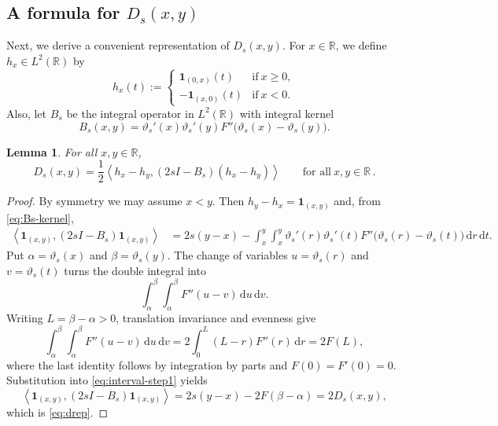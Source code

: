 \documentclass[11pt]{article}
\newtheorem{lemma}[theorem]{Lemma}
\theoremstyle{definition}
\theoremstyle{remark}
\newcommand{\R}{\mathbb{R}}
\newcommand{\ip}[2]{\left\langle #1,#2\right\rangle}
\newcommand{\dd}{\,\mathrm{d}}
\begin{document}

\subsection*{A formula for $D_s(x,y)$}

Next, we derive a convenient representation of $D_s(x,y)$. For $x\in\R$, we define $h_x\in L^2(\R)$ by
\begin{equation}\label{eq:hx-def}
h_x(t):=
\begin{cases}
\mathbf 1_{(0,x)}(t)& \text{if}\ x\geq0,\\
-\mathbf 1_{(x,0)}(t)& \text{if}\ x<0.
\end{cases}
\end{equation}
Also, let $B_s$ be the integral operator in $L^2(\R)$ with integral kernel
\begin{equation}\label{eq:Bs-kernel}
B_s(x,y)=\vartheta_s'(x)\vartheta_s'(y)
F''\bigl(\vartheta_s(x)-\vartheta_s(y)\bigr).
\end{equation}

\begin{lemma}\label{lem:drep}
For all $x,y\in\R$,
\begin{equation}\label{eq:drep}
D_s(x,y)=\frac12\ip{h_x-h_y}{(2sI-B_s)(h_x-h_y)}
\qquad\text{for all}\ x,y\in\R \,.
\end{equation}
\end{lemma}

\begin{proof}
By symmetry we may assume $x<y$.  Then
$h_y-h_x=\mathbf 1_{(x,y)}$ and, from \eqref{eq:Bs-kernel},
\begin{align}
\ip{\mathbf 1_{(x,y)}}{(2sI-B_s)\mathbf 1_{(x,y)}}
&=2s(y-x)-\int_x^y\int_x^y
\vartheta_s'(r)\vartheta_s'(t)
F''\bigl(\vartheta_s(r)-\vartheta_s(t)\bigr)
\dd r\dd t.
\label{eq:interval-step1}
\end{align}
Put $\alpha=\vartheta_s(x)$ and $\beta=\vartheta_s(y)$.  The change
of variables $u=\vartheta_s(r)$ and $v=\vartheta_s(t)$ turns the
double integral into
\begin{equation}\label{eq:double-Fpp}
\int_\alpha^\beta\int_\alpha^\beta F''(u-v)\dd u\dd v.
\end{equation}
Writing $L=\beta-\alpha>0$, translation invariance and evenness give
\[
\int_\alpha^\beta\int_\alpha^\beta F''(u-v)\dd u\dd v
=2\int_0^L(L-r)F''(r)\dd r=2F(L),
\]
where the last identity follows by integration by parts and
$F(0)=F'(0)=0$.  Substitution into \eqref{eq:interval-step1} yields
\[
\ip{\mathbf 1_{(x,y)}}{(2sI-B_s)\mathbf 1_{(x,y)}}
=2s(y-x)-2F(\beta-\alpha)=2D_s(x,y),
\]
which is \eqref{eq:drep}.
\end{proof}
\end{document}
